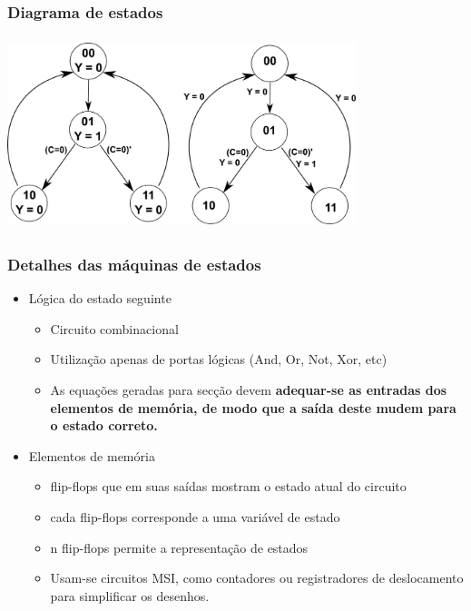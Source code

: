 \documentclass{beamer}
\begin{document}
\begin{frame}
  \frametitle{Diagrama de estados}
    \includegraphics[height = 2.2in, width = 4in]{mealyvsmoore_6.png}
\end{frame}

\begin{frame}
 \frametitle{Detalhes das máquinas de estados}
  \begin{itemize}
   \item Lógica do estado seguinte\pause
   \begin{itemize}
    \item Circuito combinacional\pause
    \item Utilização apenas de portas lógicas (And, Or, Not, Xor, etc)\pause
    \item As equações geradas para secção devem \textbf{adequar-se as entradas dos elementos de memória, de modo que a saída deste mudem para o estado correto.} \pause
   \end{itemize}
    \item Elementos de memória\pause
      \begin{itemize}
       \item flip-flops que em suas saídas mostram o estado atual do circuito\pause
       \item cada flip-flops corresponde a uma variável de estado \pause
       \item n flip-flops permite a representação de estados \pause
       \item Usam-se circuitos MSI, como contadores ou registradores de deslocamento para simplificar os desenhos. 
      \end{itemize}
  \end{itemize}
\end{frame}
\end{document}

